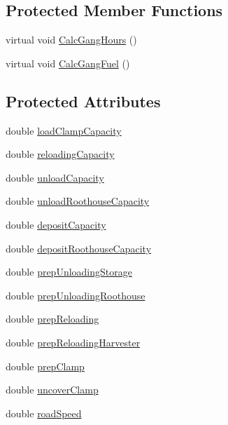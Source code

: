 \subsection*{Protected Member Functions}
\begin{DoxyCompactItemize}
\item 
virtual void \hyperlink{classharvest_tech_a76ab6bbf21dabdf2dccc36bb5a632f9e}{CalcGangHours} ()
\item 
virtual void \hyperlink{classharvest_tech_a7da76cf91a1af094816d27b373e7f913}{CalcGangFuel} ()
\end{DoxyCompactItemize}
\subsection*{Protected Attributes}
\begin{DoxyCompactItemize}
\item 
double \hyperlink{classharvest_tech_a93d97054ababd16fce76c51d42975f55}{loadClampCapacity}
\item 
double \hyperlink{classharvest_tech_a86f9582f0ac899f0ba02e43610cd8a14}{reloadingCapacity}
\item 
double \hyperlink{classharvest_tech_ad7098f90d7fbb9d02a12dad4714de781}{unloadCapacity}
\item 
double \hyperlink{classharvest_tech_ad73c0def5ee037378be9afcee7cfbf72}{unloadRoothouseCapacity}
\item 
double \hyperlink{classharvest_tech_ab042ca61e906ae05ff26c8ff4071a7e7}{depositCapacity}
\item 
double \hyperlink{classharvest_tech_a552aa9da2e2c63e010bc7227a5988ee3}{depositRoothouseCapacity}
\item 
double \hyperlink{classharvest_tech_a41a9494ba016f84157185069c96ae472}{prepUnloadingStorage}
\item 
double \hyperlink{classharvest_tech_a2d41e95efc4e103511f72f09fc610426}{prepUnloadingRoothouse}
\item 
double \hyperlink{classharvest_tech_a9c2a254f2e35e8ee1065911fe0028c80}{prepReloading}
\item 
double \hyperlink{classharvest_tech_a57e05f0cb4467a2aff0e6433a6c3d26e}{prepReloadingHarvester}
\item 
double \hyperlink{classharvest_tech_a27e1ea7eab9adc9b2d2a0d94fe78b80d}{prepClamp}
\item 
double \hyperlink{classharvest_tech_a63be74e621105c9148ca2f98edb29fb8}{uncoverClamp}
\item 
double \hyperlink{classharvest_tech_a6738cd70c0169d7a3653c1e75868b461}{roadSpeed}

\end{DoxyCompactItemize}
